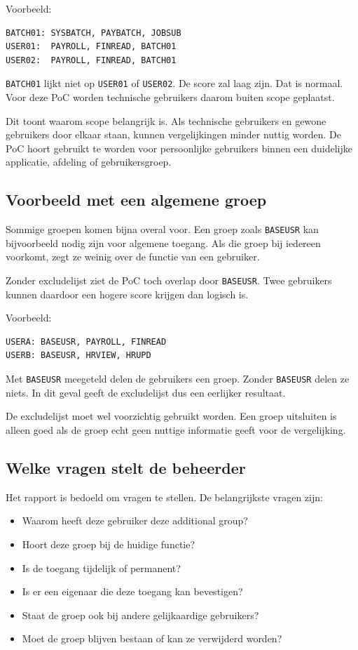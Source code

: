 Voorbeeld:

\begin{verbatim}
BATCH01: SYSBATCH, PAYBATCH, JOBSUB
USER01:  PAYROLL, FINREAD, BATCH01
USER02:  PAYROLL, FINREAD, BATCH01
\end{verbatim}

\texttt{BATCH01} lijkt niet op \texttt{USER01} of \texttt{USER02}. De score zal laag zijn. Dat is normaal. Voor deze PoC worden technische gebruikers daarom buiten scope geplaatst.

Dit toont waarom scope belangrijk is. Als technische gebruikers en gewone gebruikers door elkaar staan, kunnen vergelijkingen minder nuttig worden. De PoC hoort gebruikt te worden voor persoonlijke gebruikers binnen een duidelijke applicatie, afdeling of gebruikersgroep.

\subsection*{Voorbeeld met een algemene groep}

Sommige groepen komen bijna overal voor. Een groep zoals \texttt{BASEUSR} kan bijvoorbeeld nodig zijn voor algemene toegang. Als die groep bij iedereen voorkomt, zegt ze weinig over de functie van een gebruiker.

Zonder excludelijst ziet de PoC toch overlap door \texttt{BASEUSR}. Twee gebruikers kunnen daardoor een hogere score krijgen dan logisch is.

Voorbeeld:

\begin{verbatim}
USERA: BASEUSR, PAYROLL, FINREAD
USERB: BASEUSR, HRVIEW, HRUPD
\end{verbatim}

Met \texttt{BASEUSR} meegeteld delen de gebruikers een groep. Zonder \texttt{BASEUSR} delen ze niets. In dit geval geeft de excludelijst dus een eerlijker resultaat.

De excludelijst moet wel voorzichtig gebruikt worden. Een groep uitsluiten is alleen goed als de groep echt geen nuttige informatie geeft voor de vergelijking.

\subsection*{Welke vragen stelt de beheerder}

Het rapport is bedoeld om vragen te stellen. De belangrijkste vragen zijn:

\begin{itemize}
	\item Waarom heeft deze gebruiker deze additional group?
	\item Hoort deze groep bij de huidige functie?
	\item Is de toegang tijdelijk of permanent?
	\item Is er een eigenaar die deze toegang kan bevestigen?
	\item Staat de groep ook bij andere gelijkaardige gebruikers?
	\item Moet de groep blijven bestaan of kan ze verwijderd worden?
\end{itemize}

